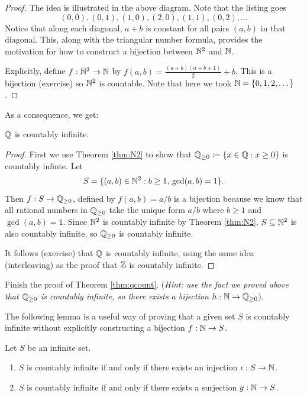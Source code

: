 \documentclass[../analysis1.tex]{subfiles}
\begin{document}
\begin{proof}
    The idea is illustrated in the above diagram. Note that the listing goes $$(0,0),(0,1),(1,0),(2,0),(1,1),(0,2),\dots$$
    Notice that along each diagonal, $a+b$ is constant for all pairs $(a,b)$ in that diagonal. This, along with the triangular number formula,
    provides the motivation for how to construct a bijection between $\mathbb{N}^2$ and $\mathbb{N}$.\par
    Explicitly, define $f:\mathbb{N}^2\to\mathbb{N}$ by $f(a,b)=\frac{(a+b)(a+b+1)}{2}+b$. This is a bijection (exercise) so $\mathbb{N}^2$ is countable. Note that here we took $\mathbb{N}=\{0,1,2,\dots\}$.\qedhere
\end{proof}
As a consequence, we get:
\begin{theorem}
\label{thm:qcount}
    \begin{shaded*}
        $\mathbb{Q}$ is countably infinite.
    \end{shaded*}
\end{theorem}
\begin{proof}
    First we use Theorem \ref{thm:N2} to show that $\mathbb{Q}_{\ge 0}\coloneqq \{x\in\mathbb{Q}:x\ge 0\}$ is countably infinte.
    Let $$S=\{(a,b)\in\mathbb{N}^2: b\ge 1,\, \gcd(a,b)=1\}.$$
    Then $f:S\to \mathbb{Q}_{\ge 0 }$, defined by $f(a,b)=a/b$ is a bijection because we know that all rational numbers in $\mathbb{Q}_{\ge 0}$ take the unique form $a/b$ where $b\ge 1$ and $\gcd(a,b)=1$.
    Since $\mathbb{N}^2$ is countably infinite by Theorem \ref{thm:N2}, $S\subseteq \mathbb{N}^2$ is also countably infinite, so $\mathbb{Q}_{\ge 0}$ is countably infinite.\par
    It follows (exercise) that $\mathbb{Q}$ is countably infinite, using the same idea (interleaving) as the proof that $\mathbb{Z}$ is countably infinite.
\end{proof}
\begin{exercise*}
Finish the proof of Theorem \ref{thm:qcount}. (\textit{Hint: use the fact we proved above that $\mathbb{Q}_{\ge 0}$ is countably infinite, so there exists a bijection }$h:\mathbb{N}\to\mathbb{Q}_{\ge0}$).
\end{exercise*}

The following lemma is a useful way of proving that a given set $S$ is countably infinite without explicitly constructing a bijection $f:\mathbb{N}\to S$.

\begin{lemma}
\label{lem:countabilitycriterion}
    \begin{shaded*}
        Let $S$ be an infinite set.
        \begin{enumerate}
            \item[1.] $S$ is countably infinite if and only if there exists an injection $\iota: S\to\mathbb{N}$.
            \item[2.] $S$ is countably infinite if and only if there exists a surjection $g:\mathbb{N}\to S$.
        \end{enumerate}
    \end{shaded*}
\end{lemma}
\end{document}
